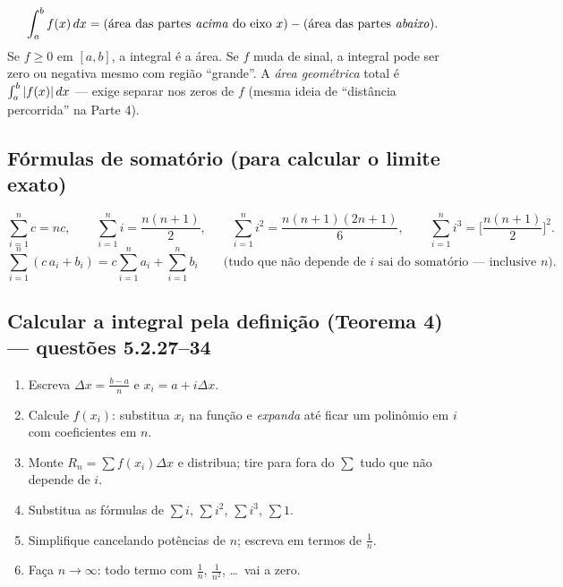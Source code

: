 \begin{definicao}[{Integral definida $=$ área líquida (com sinal)}]
\[
\int_a^b f(x)\,dx = (\text{área das partes \emph{acima} do eixo }x) - (\text{área das partes \emph{abaixo}}).
\]
Se $f\ge 0$ em $[a,b]$, a integral é a área. Se $f$ muda de sinal, a integral pode ser zero ou negativa mesmo com região ``grande''. A \emph{área geométrica} total é $\int_a^b |f(x)|\,dx$ --- exige separar nos zeros de $f$ (mesma ideia de ``distância percorrida'' na Parte 4).
\end{definicao}

\subsection{Fórmulas de somatório (para calcular o limite exato)}

\begin{definicao}
\[
\sum_{i=1}^n c = nc,\qquad
\sum_{i=1}^n i=\frac{n(n+1)}{2},\qquad
\sum_{i=1}^n i^2=\frac{n(n+1)(2n+1)}{6},\qquad
\sum_{i=1}^n i^3=\Big[\frac{n(n+1)}{2}\Big]^2 .
\]
\[
\sum_{i=1}^n (c\,a_i+b_i)=c\sum_{i=1}^n a_i+\sum_{i=1}^n b_i \qquad\text{(tudo que não depende de $i$ sai do somatório --- inclusive $n$)}.
\]
\end{definicao}

\subsection{Calcular a integral pela definição (Teorema 4) --- questões 5.2.27--34}

\begin{metodo}
\begin{enumerate}[leftmargin=1.6em, itemsep=1pt]
\item Escreva $\Delta x=\frac{b-a}{n}$ e $x_i=a+i\Delta x$.
\item Calcule $f(x_i)$: substitua $x_i$ na função e \emph{expanda} até ficar um polinômio em $i$ com coeficientes em $n$.
\item Monte $R_n=\sum f(x_i)\Delta x$ e distribua; tire para fora do $\sum$ tudo que não depende de $i$.
\item Substitua as fórmulas de $\sum i$, $\sum i^2$, $\sum i^3$, $\sum 1$.
\item Simplifique cancelando potências de $n$; escreva em termos de $\frac1n$.
\item Faça $n\to\infty$: todo termo com $\frac1n$, $\frac1{n^2}$, \dots\ vai a zero.
\end{enumerate}
\end{metodo}

